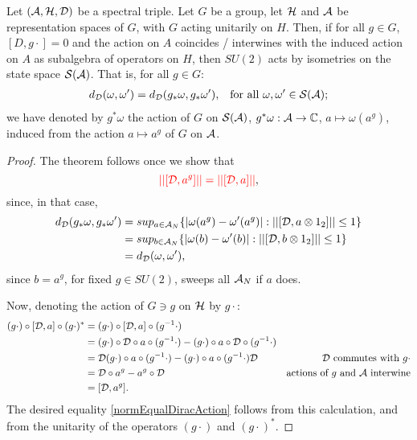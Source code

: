 \begin{theorem} \label{theoGInvariantDistance}
Let $(\mathcal A, \mathcal H, \mathcal D)$ be a spectral triple. Let $G$ be a group, let $\mathcal H$ and $\mathcal A$ be representation spaces of $G$, with $G$ acting unitarily on $H$. Then, if for all $g \in G$, $[D, g\cdot] = 0$ and the action on $A$ coincides / interwines with the induced action on $A$ as subalgebra of operators on $H$, then $SU(2)$ acts by isometries on the state space $\mathcal S(\mathcal A)$. That is, for all $g \in G$:
\begin{align}
    d_\mathcal D(\omega, \omega') &= d_\mathcal D(g_* \omega, g_*\omega'), & \text{for all $\omega, \omega' \in \mathcal S(\mathcal A)$};
\end{align}
we have denoted by $g^*\omega$ the action of $G$ on $\mathcal S(\mathcal A)$, $g^* \omega: \mathcal A \to \mathbb{C}$, $a \mapsto \omega(a^g)$, induced from the action $a \mapsto a^g$ of $G$ on $\mathcal A$.
\end{theorem}

\begin{proof}
The theorem follows once we show that 
\begin{equation}\label{normEqualDiracAction}
    \textcolor{red}{||[\mathcal D, a^g]|| = ||[\mathcal D, a]||},
\end{equation} since, in that case,
\begin{align*}
d_\mathcal D(g_* \omega, g_* \omega') &= sup_{a \in \mathcal A_N}\{ |\omega(a^g) - \omega'(a^g)|: ||[\mathcal D, a \otimes 1_2]|| \leq 1 \} \\
    &= sup_{b \in \mathcal A_N}\{ |\omega(b) - \omega'(b)|: ||[\mathcal D, b \otimes 1_2]|| \leq 1 \} \\
    &= d_\mathcal D(\omega, \omega'),
\end{align*}
since $b = a^g$, for fixed $g \in SU(2)$, sweeps all $\mathcal A_N$ if $a$ does.

Now, denoting the action of $G \ni g$ on $\mathcal H$ by $g \cdot$:
\begin{align*}
    (g \cdot) \circ [\mathcal D, a]\circ (g\cdot )^* &= (g \cdot) \circ [\mathcal D, a]\circ (g^{-1}\cdot )\\
        &= (g \cdot) \circ \mathcal D \circ a \circ (g^{-1}\cdot ) - (g \cdot) \circ a \circ  \mathcal D \circ (g^{-1}\cdot )\\
        &= \mathcal D (g \cdot) \circ a\circ (g^{-1}\cdot ) - (g \cdot) \circ a\circ (g^{-1}\cdot ) \mathcal D & \text{$\mathcal D$ commutes with $g\cdot$} \\
        &= \mathcal D \circ a^g - a^g \circ \mathcal D & \text{actions of $g$ and $\mathcal A$ interwine} \\
        & = [\mathcal D, a^g].
\end{align*} The desired equality \eqref{normEqualDiracAction} follows from this calculation, and from the unitarity of the operators $(g \cdot)$ and $(g\cdot)^*$.
\end{proof}

